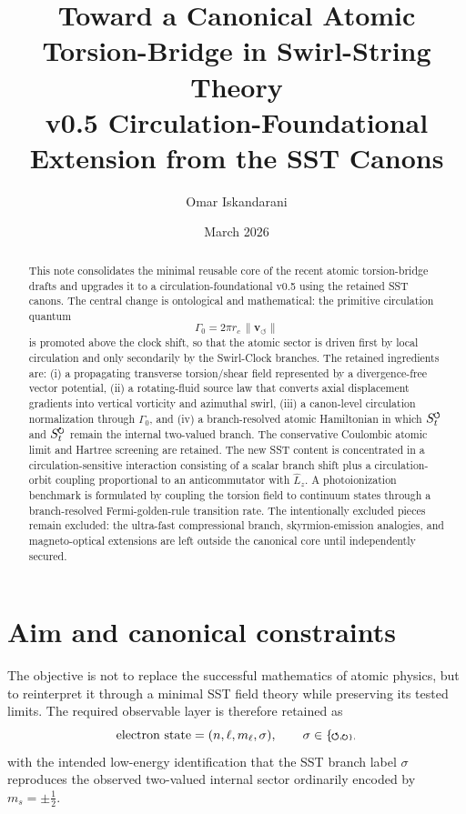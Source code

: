 \documentclass[11pt,a4paper]{article}
\title{Toward a Canonical Atomic Torsion-Bridge in Swirl-String Theory\\
\large v0.5 Circulation-Foundational Extension from the SST Canons}
\author{Omar Iskandarani}
\date{March 2026}
\newcommand{\swirlarrow}{\mathchoice{\mkern-2mu\scriptstyle\boldsymbol{\circlearrowleft}}{\mkern-2mu\scriptstyle\boldsymbol{\circlearrowleft}}{\mkern-2mu\scriptscriptstyle\boldsymbol{\circlearrowleft}}{\mkern-2mu\scriptscriptstyle\boldsymbol{\circlearrowleft}}}
\newcommand{\swirlarrowcw}{\mathchoice{\mkern-2mu\scriptstyle\boldsymbol{\circlearrowright}}{\mkern-2mu\scriptstyle\boldsymbol{\circlearrowright}}{\mkern-2mu\scriptscriptstyle\boldsymbol{\circlearrowright}}{\mkern-2mu\scriptscriptstyle\boldsymbol{\circlearrowright}}}
\newcommand{\SwirlClock}{S_t^{\swirlarrow}}
\newcommand{\SwirlClockcw}{S_t^{\swirlarrowcw}}
\begin{document}
\maketitle

\begin{abstract}
This note consolidates the minimal reusable core of the recent atomic torsion-bridge drafts and upgrades it to a circulation-foundational v0.5 using the retained SST canons. The central change is ontological and mathematical: the primitive circulation quantum
\[
\Gamma_0 = 2\pi r_c\,\lVert \mathbf{v}_{\!\boldsymbol{\circlearrowleft}}\rVert
\]
is promoted above the clock shift, so that the atomic sector is driven first by local circulation and only secondarily by the Swirl-Clock branches. The retained ingredients are: (i) a propagating transverse torsion/shear field represented by a divergence-free vector potential, (ii) a rotating-fluid source law that converts axial displacement gradients into vertical vorticity and azimuthal swirl, (iii) a canon-level circulation normalization through $\Gamma_0$, and (iv) a branch-resolved atomic Hamiltonian in which $\SwirlClock$ and $\SwirlClockcw$ remain the internal two-valued branch. The conservative Coulombic atomic limit and Hartree screening are retained. The new SST content is concentrated in a circulation-sensitive interaction consisting of a scalar branch shift plus a circulation-orbit coupling proportional to an anticommutator with $\hat L_z$. A photoionization benchmark is formulated by coupling the torsion field to continuum states through a branch-resolved Fermi-golden-rule transition rate. The intentionally excluded pieces remain excluded: the ultra-fast compressional branch, skyrmion-emission analogies, and magneto-optical extensions are left outside the canonical core until independently secured.
\end{abstract}

\section{Aim and canonical constraints}
The objective is not to replace the successful mathematics of atomic physics, but to reinterpret it through a minimal SST field theory while preserving its tested limits. The required observable layer is therefore retained as
\begin{equation}
\label{eq:state-labels}
\text{electron state}=(n,\ell,m_\ell,\sigma),
\qquad
\sigma\in\{\swirlarrow,\swirlarrowcw\},
\end{equation}
with the intended low-energy identification that the SST branch label $\sigma$ reproduces the observed two-valued internal sector ordinarily encoded by $m_s=\pm \tfrac12$.
\end{document}
